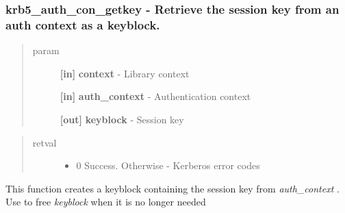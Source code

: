 \documentclass[letterpaper,10pt,english]{sphinxmanual}
\begin{document}
\subsubsection{krb5\_auth\_con\_getkey -  Retrieve the session key from an auth context as a keyblock.}
\label{appdev/refs/api/krb5_auth_con_getkey::doc}\label{appdev/refs/api/krb5_auth_con_getkey:krb5-auth-con-getkey-retrieve-the-session-key-from-an-auth-context-as-a-keyblock}

\begin{fulllineitems}
\label{appdev/refs/api/krb5_auth_con_getkey:c.krb5_auth_con_getkey}
\end{fulllineitems}

\begin{quote}\begin{description}
\item[{param}] \leavevmode
\textbf{{[}in{]}} \textbf{context} - Library context

\textbf{{[}in{]}} \textbf{auth\_context} - Authentication context

\textbf{{[}out{]}} \textbf{keyblock} - Session key

\end{description}\end{quote}
\begin{quote}\begin{description}
\item[{retval}] \leavevmode\begin{itemize}
\item {} 
0   Success. Otherwise - Kerberos error codes

\end{itemize}

\end{description}\end{quote}

This function creates a keyblock containing the session key from \emph{auth\_context} . Use {\hyperref[appdev/refs/api/krb5_free_keyblock:c.krb5_free_keyblock]{}} to free \emph{keyblock} when it is no longer needed
\end{document}
